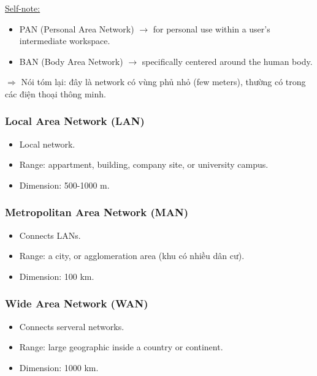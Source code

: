 \noindent
\underline{Self-note:}

\begin{itemize}
    \item PAN (Personal Area Network) $\rightarrow$ for personal use within a user's intermediate workspace.
    \item BAN (Body Area Network) $\rightarrow$ specifically centered around the human body.
\end{itemize}

\noindent
$\Rightarrow$ Nói tóm lại: đây là network có vùng phủ nhỏ (few meters), thường có trong các điện thoại thông minh.
\medskip

\subsubsection{Local Area Network (LAN)}

\begin{itemize}
    \item Local network.
    \item Range: appartment, building, company site, or university campus.
    \item Dimension: 500-1000 m.
\end{itemize}

\subsubsection{Metropolitan Area Network (MAN)}

\begin{itemize}
    \item Connects LANs.
    \item Range: a city, or agglomeration area (khu có nhiều dân cư).
    \item Dimension: 100 km.
\end{itemize}

\subsubsection{Wide Area Network (WAN)}

\begin{itemize}
    \item Connects serveral networks.
    \item Range: large geographic inside a country or continent.
    \item Dimension: 1000 km.
\end{itemize}

